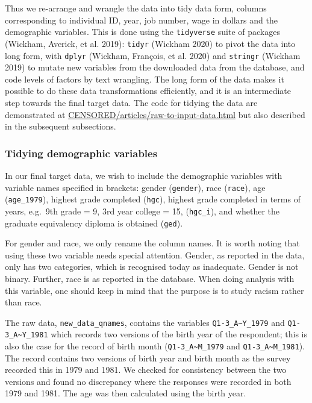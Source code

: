 \documentclass{article}
\begin{document}
Thus we re-arrange and wrangle the data into tidy data form, columns corresponding to individual ID, year, job number, wage in dollars and the demographic variables. This is done using the \texttt{tidyverse} suite of packages (Wickham, Averick, et al. 2019): \texttt{tidyr} (Wickham 2020) to pivot the data into long form, with \texttt{dplyr} (Wickham, François, et al. 2020) and \texttt{stringr} (Wickham 2019) to mutate new variables from the downloaded data from the database, and code levels of factors by text wrangling. The long form of the data makes it possible to do these data transformations efficiently, and it is an intermediate step towards the final target data. The code for tidying the data are demonstrated at \url{CENSORED/articles/raw-to-input-data.html} but also described in the subsequent subsections.

\hypertarget{tidydemog}{%
\subsubsection{Tidying demographic variables}\label{tidydemog}}

In our final target data, we wish to include the demographic variables with variable names specified in brackets: gender (\texttt{gender}), race (\texttt{race}), age (\texttt{age\_1979}), highest grade completed (\texttt{hgc}), highest grade completed in terms of years, e.g.~9th grade = 9, 3rd year college = 15, (\texttt{hgc\_i}), and whether the graduate equivalency diploma is obtained (\texttt{ged}).

For gender and race, we only rename the column names. It is worth noting that using these two variable needs special attention. Gender, as reported in the data, only has two categories, which is recognised today as inadequate. Gender is not binary. Further, race is as reported in the database. When doing analysis with this variable, one should keep in mind that the purpose is to study racism rather than race.

The raw data, \texttt{new\_data\_qnames}, contains the variables \texttt{Q1-3\_A\textasciitilde{}Y\_1979} and \texttt{Q1-3\_A\textasciitilde{}Y\_1981} which records two versions of the birth year of the respondent; this is also the case for the record of birth month (\texttt{Q1-3\_A\textasciitilde{}M\_1979} and \texttt{Q1-3\_A\textasciitilde{}M\_1981}). The record contains two versions of birth year and birth month as the survey recorded this in 1979 and 1981. We checked for consistency between the two versions and found no discrepancy where the responses were recorded in both 1979 and 1981. The age was then calculated using the birth year.
\end{document}

